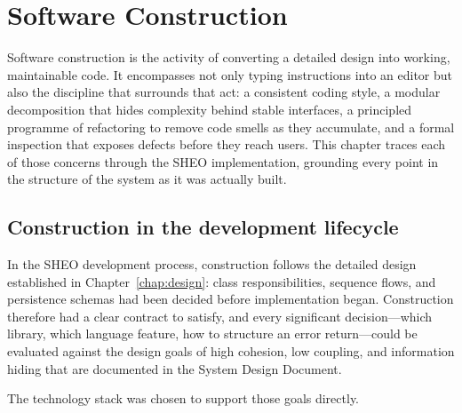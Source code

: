 \chapter{Software Construction}
\label{chap:construction}

Software construction is the activity of converting a
detailed design into working, maintainable code. It encompasses not only typing
instructions into an editor but also the discipline that surrounds that act: a
consistent coding style, a modular decomposition that hides complexity behind stable
interfaces, a principled programme of refactoring to remove code smells as they
accumulate, and a formal inspection that exposes defects before they reach users. This
chapter traces each of those concerns through the SHEO implementation, grounding every
point in the structure of the system as it was actually built.

\section{Construction in the development lifecycle}
\label{sec:construction-lifecycle}

In the SHEO development process, construction follows the detailed design established
in Chapter~\ref{chap:design}: class responsibilities, sequence flows, and persistence
schemas had been decided before implementation began. Construction therefore had a
clear contract to satisfy, and every significant decision---which library, which
language feature, how to structure an error return---could be evaluated against the
design goals of high cohesion, low coupling, and information hiding that are
documented in the System Design Document.

The technology stack was chosen to support those goals directly.

